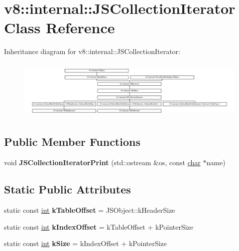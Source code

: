 \hypertarget{classv8_1_1internal_1_1JSCollectionIterator}{}\section{v8\+:\+:internal\+:\+:J\+S\+Collection\+Iterator Class Reference}
\label{classv8_1_1internal_1_1JSCollectionIterator}
Inheritance diagram for v8\+:\+:internal\+:\+:J\+S\+Collection\+Iterator\+:\begin{figure}[H]
\begin{center}
\leavevmode
\includegraphics[height=2.897265cm]{classv8_1_1internal_1_1JSCollectionIterator}
\end{center}
\end{figure}
\subsection*{Public Member Functions}
\begin{DoxyCompactItemize}
\item 
\mbox{\label{classv8_1_1internal_1_1JSCollectionIterator_ac8a30530b3d687fdad5c9881b9d82d3c}} 
void {\bfseries J\+S\+Collection\+Iterator\+Print} (std\+::ostream \&os, const \mbox{\hyperlink{classchar}{char}} $\ast$name)
\end{DoxyCompactItemize}
\subsection*{Static Public Attributes}
\begin{DoxyCompactItemize}
\item 
\mbox{\label{classv8_1_1internal_1_1JSCollectionIterator_a69eb37dd361825526ca203a8d994c7ea}} 
static const \mbox{\hyperlink{classint}{int}} {\bfseries k\+Table\+Offset} = J\+S\+Object\+::k\+Header\+Size
\item 
\mbox{\label{classv8_1_1internal_1_1JSCollectionIterator_a55d6d6c3a4fe01a681ebc59eb47313ea}} 
static const \mbox{\hyperlink{classint}{int}} {\bfseries k\+Index\+Offset} = k\+Table\+Offset + k\+Pointer\+Size
\item 
\mbox{\label{classv8_1_1internal_1_1JSCollectionIterator_a454ed0e2f48481e60220cc0a267151d2}} 
static const \mbox{\hyperlink{classint}{int}} {\bfseries k\+Size} = k\+Index\+Offset + k\+Pointer\+Size
\end{DoxyCompactItemize}
